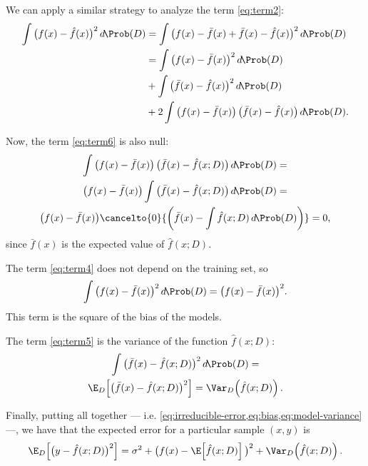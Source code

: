 We can apply a similar strategy to analyze the term \eqref{eq:term2}:
\begin{align}
  \notag \int \big( f(x) - \hat{f}(x) \big)^2\, d\!\Prob(D)
    &= \int \big( f(x) - \bar{f}(x) + \bar{f}(x) - \hat{f}(x) \big)^2\, d\!\Prob(D) \\
    &= \label{eq:term4}\int \big( f(x) - \bar{f}(x) \big)^2\, d\!\Prob(D) \\
    &+ \label{eq:term5}\int \big( \bar{f}(x) - \hat{f}(x) \big)^2\, d\!\Prob(D) \\
    &+ \label{eq:term6}2 \int \big( f(x) - \bar{f}(x) \big)\,\big( \bar{f}(x) - \hat{f}(x) \big)\, d\!\Prob(D)\text{.}
\end{align}

Now, the term \eqref{eq:term6} is also null:
\begin{multline*}
  \int \big( f(x) - \bar{f}(x) \big)\,\big( \bar{f}(x) - \hat{f}(x; D) \big)\, d\!\Prob(D) = \\
  \big( f(x) - \bar{f}(x) \big) \int \big( \bar{f}(x) - \hat{f}(x; D) \big)\, d\!\Prob(D) = \\
  \big( f(x) - \bar{f}(x) \big) \cancelto{0}{\left( \bar{f}(x) - \int \hat{f}(x; D)\, d\!\Prob(D) \right)} = 0\text{,}
\end{multline*}
since $\bar{f}(x)$ is the expected value of $\hat{f}(x; D)$.

The term \eqref{eq:term4} does not depend on the training set, so
\begin{equation}
  \label{eq:bias}
  \int \big( f(x) - \bar{f}(x) \big)^2\, d\!\Prob(D) =
  \big( f(x) - \bar{f}(x) \big)^2\text{.}
\end{equation}
This term is the square of the bias of the models.

The term \eqref{eq:term5} is the variance of the function $\hat{f}(x; D)$:
\begin{multline}
  \label{eq:model-variance}
  \int \big( \bar{f}(x) - \hat{f}(x; D) \big)^2\, d\!\Prob(D) =\\
  \E_D\!\left[ \big( \bar{f}(x) - \hat{f}(x; D) \big)^2 \right] =
  \Var_D\!\left( \hat{f}(x; D) \right)\text{.}
\end{multline}

Finally, putting all together --- i.e.  \cref{eq:irreducible-error,eq:bias,eq:model-variance}
---, we have that the expected error for a particular sample $(x, y)$ is
\[
  \E_D\!\left[ \big( y - \hat{f}(x; D) \big)^2 \right] =
    \sigma^2 +
    \big( f(x) - \E\!\left[ \hat{f}(x; D) \right] \big)^2 +
    \Var_D\!\left( \hat{f}(x; D) \right)\text{.}
\]

